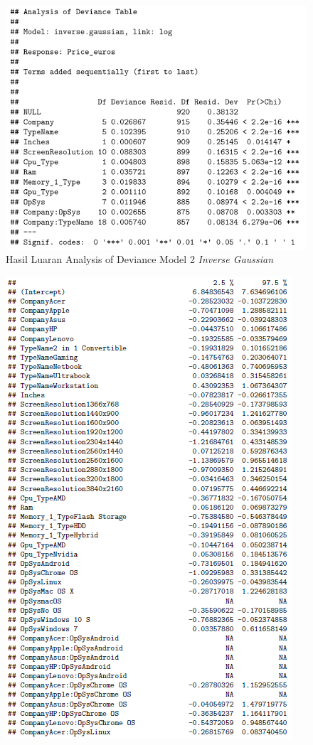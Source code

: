 \documentclass[12pt]{article}
\begin{document}
\begin{figure}[h!]
    \centering
    \includegraphics{Model_4_AOV.png}
    \caption{Hasil Luaran Analysis of Deviance Model 2 \textit{Inverse Gaussian}}
    \label{fig:AOV4}
\end{figure}
\begin{figure}[h!]
    \centering
    \includegraphics{Model_4_CI(1_5).png}
    \label{fig:CI41}
\end{figure}
\end{document}
